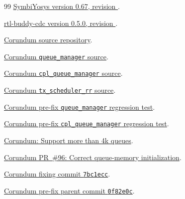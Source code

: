 \documentclass[conference]{IEEEtran}
\begin{document}
\begin{thebibliography}{99}
\href{https://github.com/YosysHQ/sby/commit/fea6e467d067b3ea84b6b5ac08cd48beb59f0d42}{SymbiYosys version 0.67, revision
}.

\href{https://github.com/rtl-buddy/rtl-buddy-cdc/commit/df996d55af0e8b824183d03d531426b8601af429}{rtl-buddy-cdc version 0.5.0, revision
}.

\href{https://github.com/corundum/corundum}{Corundum source repository}.

\href{https://github.com/corundum/corundum/blob/0560f98e799d741d62522e61bf23321fc3f2880b/fpga/common/rtl/queue_manager.v}{Corundum \texttt{queue\_manager} source}.

\href{https://github.com/corundum/corundum/blob/0560f98e799d741d62522e61bf23321fc3f2880b/fpga/common/rtl/cpl_queue_manager.v}{Corundum \texttt{cpl\_queue\_manager} source}.

\href{https://github.com/corundum/corundum/blob/0560f98e799d741d62522e61bf23321fc3f2880b/fpga/common/rtl/tx_scheduler_rr.v}{Corundum \texttt{tx\_scheduler\_rr} source}.

\href{https://github.com/corundum/corundum/blob/0f82e0c5f3b9fa9a15e99d6e43b08b3b4dff7909/fpga/common/tb/queue_manager/test_queue_manager.py}{Corundum pre-fix \texttt{queue\_manager} regression test}.

\href{https://github.com/corundum/corundum/blob/0f82e0c5f3b9fa9a15e99d6e43b08b3b4dff7909/fpga/common/tb/cpl_queue_manager/test_cpl_queue_manager.py}{Corundum pre-fix \texttt{cpl\_queue\_manager} regression test}.

\href{https://github.com/corundum/corundum/commit/0560f98e799d741d62522e61bf23321fc3f2880b}{Corundum: Support more than 4k queues}.

\href{https://github.com/corundum/corundum/pull/96}{Corundum PR~\#96: Correct queue-memory initialization}.

\href{https://github.com/corundum/corundum/commit/7bc1ecc711f3d4fce55290e0ed6d94a549cc2528}{Corundum fixing commit \texttt{7bc1ecc}}.

\href{https://github.com/corundum/corundum/commit/0f82e0c5f3b9fa9a15e99d6e43b08b3b4dff7909}{Corundum pre-fix parent commit \texttt{0f82e0c}}.


\end{thebibliography}
\end{document}

